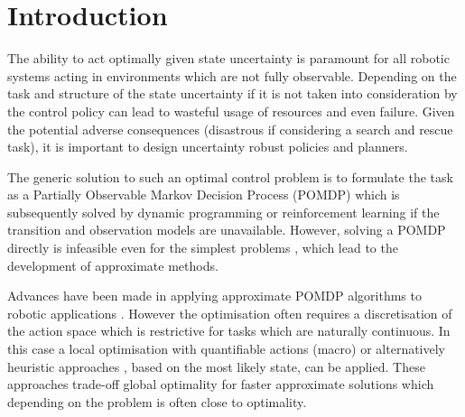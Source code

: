 \documentclass[final,5p,times,twocolumn]{elsarticle}
\begin{document}
\section{Introduction}

The ability to act optimally given state uncertainty is paramount for all robotic systems acting in 
environments which are not fully observable. Depending on the task and structure of the state
uncertainty if it is not taken into consideration by the control policy can lead to wasteful usage of resources 
and even failure. Given the potential adverse consequences (disastrous if considering a search and rescue task), 
it is important to design uncertainty robust policies and planners.

The generic solution to such an optimal control problem is to formulate the task as a
Partially Observable Markov Decision Process (POMDP) which is subsequently solved by dynamic programming
or reinforcement learning if the transition and observation models are unavailable. 
However, solving a POMDP directly is infeasible even for the simplest problems \cite{PBVI_2003}, which 
lead to the development of approximate methods. 

Advances have been made in applying approximate POMDP algorithms to robotic applications
\cite{pomdp_peg_icra_2014}. However the optimisation often requires a discretisation of the 
action space which is restrictive for tasks which are naturally continuous. In this case
a local optimisation with quantifiable actions (macro) \cite{toussain_2015} or alternatively heuristic 
approaches \cite{Lauri2016}, based on the most likely state, can be applied. 
These approaches trade-off global optimality for faster approximate solutions which depending on 
the problem is often close to optimality. 

%
%
%
%
%
%
\end{document}
